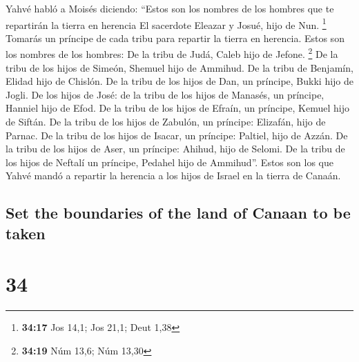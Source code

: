 \begin{paracol}{2}
 Yahvé habló a Moisés diciendo:  ``Estos
son los nombres de los hombres que te repartirán la tierra en herencia
El sacerdote Eleazar y Josué, hijo de Nun. \footnote{\textbf{34:17} Jos
  14,1; Jos 21,1; Deut 1,38}  Tomarás un príncipe de cada
tribu para repartir la tierra en herencia.  Estos son los
nombres de los hombres: De la tribu de Judá, Caleb hijo de Jefone.
\footnote{\textbf{34:19} Núm 13,6; Núm 13,30}  De la
tribu de los hijos de Simeón, Shemuel hijo de Ammihud. 
De la tribu de Benjamín, Elidad hijo de Chislón.  De la
tribu de los hijos de Dan, un príncipe, Bukki hijo de Jogli.
 De los hijos de José: de la tribu de los hijos de
Manasés, un príncipe, Hanniel hijo de Efod.  De la tribu
de los hijos de Efraín, un príncipe, Kemuel hijo de Siftán.
 De la tribu de los hijos de Zabulón, un príncipe:
Elizafán, hijo de Parnac.  De la tribu de los hijos de
Isacar, un príncipe: Paltiel, hijo de Azzán.  De la tribu
de los hijos de Aser, un príncipe: Ahihud, hijo de Selomi.
 De la tribu de los hijos de Neftalí un príncipe, Pedahel
hijo de Ammihud''.  Estos son los que Yahvé mandó a
repartir la herencia a los hijos de Israel en la tierra de Canaán.

\switchcolumn
\begin{otherlanguage}{english}

\hypertarget{set-the-boundaries-of-the-land-of-canaan-to-be-taken}{%
\subsection{Set the boundaries of the land of Canaan to be
taken}\label{set-the-boundaries-of-the-land-of-canaan-to-be-taken}}

\hypertarget{section-67}{%
\section{34}\label{section-67}}


\end{otherlanguage}
\end{paracol}
